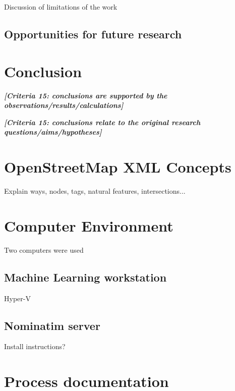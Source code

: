 \documentclass[11pt,twoside]{report}
\newcommand{\remark}[1]{{\bf \em [\marginpar{$\Leftarrow$}#1]}}
\begin{document}
Discussion of limitations of the work


\section{Opportunities for future research}
\label{s:future_work}




\chapter{Conclusion}

\remark{Criteria 15: conclusions are supported by the observations/results/calculations}

\remark{Criteria 15: conclusions relate to the original research questions/aims/hypotheses}
\appendix


\chapter{OpenStreetMap XML Concepts}
\label{a:osm_concepts}

Explain ways, nodes, tags, natural features, intersections...


\chapter{Computer Environment}
\label{a:environment}

Two computers were used

\section{Machine Learning workstation}
\label{a:computer}

Hyper-V

\section{Nominatim server}
\label{a:nominatim}

Install instructions?


\chapter{Process documentation}
\label{a:process}
\end{document}
